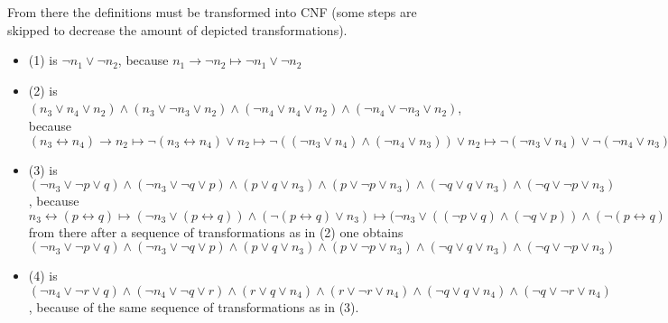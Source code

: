 \documentclass[11pt,a4paper]{article}
\begin{document}
From there the definitions must be transformed into CNF (some steps are skipped to decrease the amount of depicted transformations). 
\begin{itemize}
\item (1) is $\neg n_1 \lor \neg n_2$, because $n_1 \to \neg n_2 \mapsto \neg n_1 \lor \neg n_2$ 
\item (2) is $(n_3 \lor n_4 \lor n_2) \land (n_3 \lor \neg  n_3 \lor n_2) \land (\neg n_4 \lor  n_4 \lor n_2) \land(\neg n_4 \lor  \neg  n_3 \lor n_2)$, because $(n_3 \leftrightarrow n_4) \to n_2 \mapsto \neg (n_3 \leftrightarrow n_4) \lor n_2 \mapsto \neg ((\neg n_3 \lor n_4) \land (\neg n_4 \lor n_3)) \lor n_2 \mapsto \neg (\neg n_3 \lor n_4) \lor \neg (\neg n_4 \lor n_3) \lor n_2 \mapsto  (n_3 \land \neg n_4) \lor  (n_4 \land\neg  n_3) \lor n_2 \mapsto  (n_3 \lor  (n_4 \land\neg  n_3) \land (\neg n_4 \lor  (n_4 \land\neg  n_3))  \lor n_2  \mapsto  ((n_3 \lor n_4) \land (n_3 \lor \neg  n_3) \land (\neg n_4 \lor  n_4) \land(\neg n_4 \lor  \neg  n_3))  \lor n_2 \mapsto  (n_3 \lor n_4 \lor n_2) \land (n_3 \lor \neg  n_3 \lor n_2) \land (\neg n_4 \lor  n_4 \lor n_2) \land(\neg n_4 \lor  \neg  n_3 \lor n_2)$ 
\item (3) is $(\neg n_3 \lor \neg p \lor q) \land (\neg n_3 \lor \neg q \lor p) \land (p\lor q \lor n_3)\land (p \lor \neg p \lor n_3) \land (\neg q \lor q \lor n_3)\land (\neg q \lor \neg p \lor n_3)$, because  $n_3 \leftrightarrow (p \leftrightarrow q) \mapsto (\neg n_3 \lor (p \leftrightarrow q)) \land (\neg (p \leftrightarrow q) \lor n_3) \mapsto (\neg n_3 \lor ((\neg p \lor q) \land (\neg q \lor p)) \land (\neg (p \leftrightarrow q) \lor n_3) \mapsto (\neg n_3 \lor \neg p \lor q) \land (\neg n_3 \lor \neg q \lor p) \land (\neg (p \leftrightarrow q) \lor n_3) \mapsto (\neg n_3 \lor \neg p \lor q) \land (\neg n_3 \lor \neg q \lor p) \land (\neg ((\neg p \lor q) \land (\neg q \lor p)) \lor n_3)$ from there after a sequence of transformations as in (2) one obtains $(\neg n_3 \lor \neg p \lor q) \land (\neg n_3 \lor \neg q \lor p) \land (p\lor q \lor n_3)\land (p \lor \neg p \lor n_3) \land (\neg q \lor q \lor n_3)\land (\neg q \lor \neg p \lor n_3)$

\item (4) is $(\neg n_4 \lor \neg r \lor q) \land (\neg n_4 \lor \neg q \lor r) \land (r \lor q \lor n_4)\land (r \lor \neg r \lor n_4) \land (\neg q \lor q \lor n_4)\land (\neg q \lor \neg r \lor n_4)$, because of the same sequence of transformations as in (3).
\end{itemize}
\end{document}
